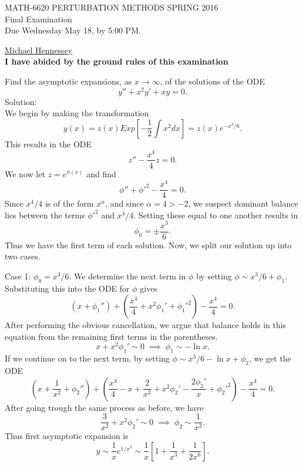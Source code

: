 

\newcommand{\Ai}{{\rm Ai}}
\newcommand{\Bi}{{\rm Bi}}
\pagestyle{empty}


\begin{center}
\large{ MATH-6620 \hspace{1in}  PERTURBATION METHODS \hspace{1in}SPRING 2016\\ Final Examination \\ Due Wednesday May 18, by 5:00 PM. }\end{center}

\bigskip
\n\ul{Michael Hennessey}\\
{\bf I have abided by the ground rules of this examination}

 \ec

\benum
\item Find the asymptotic expansions, as $x\to\infty$, of the solutions of the ODE
$$y''+x^2y'+xy=0.$$
Solution:\\

We begin by making the transformation
$$y(x)=z(x)Exp[-\frac{1}{2}\int x^2dx]=z(x)e^{-x^3/6}.$$
This results in the ODE
$$z''-\frac{x^4}{4}z=0.$$
We now let $z=e^{\phi(x)}$ and find
$$\phi''+\phi'^2-\frac{x^4}{4}=0.$$
Since $x^4/4$ is of the form $x^\alpha$, and since $\alpha=4>-2$, we suspect dominant balance lies between the terms $\phi'^2$ and $x^4/4$. Setting these equal to one another results in
$$\phi_0=\pm \frac{x^3}{6}.$$
Thus we have the first term of each solution. Now, we split our solution up into two cases.
\benum
\item Case 1: $\phi_0=x^3/6.$ We determine the next term in $\phi$ by setting $\phi\sim x^3/6+\phi_1.$ Substituting this into the ODE for $\phi$ gives
    $$ (x+\phi_1'')+(\frac{x^4}{4}+x^2\phi_1'+\phi_1'^2)-\frac{x^4}{4}=0.$$
    After performing the obvious cancellation, we argue that balance holds in this equation from the remaining first terms in the parentheses.
    $$x+x^2\phi_1'\sim 0\;\implies\;\phi_1\sim -\ln x.$$
    If we continue on to the next term, by setting $\phi\sim x^3/6-\ln x+\phi_2$, we get the ODE
    $$(x+\frac{1}{x^2}+\phi_2'')+(\frac{x^4}{4}-x+\frac{2}{x^2}+x^2\phi_2'-\frac{2\phi_2'}{x}+\phi_2'^2)-\frac{x^4}{4}=0.$$
    After going trough the same process as before, we have
    $$\frac{3}{x^2}+x^2\phi_2'\sim 0\;\implies\; \phi_2\sim\frac{1}{x^3}.$$
    Thus first asymptotic expansion is
    $$y\sim \frac{1}{x}e^{1/x^3}\sim \frac{1}{x}[1+\frac{1}{x^3}+\frac{1}{2x^6}].$$

